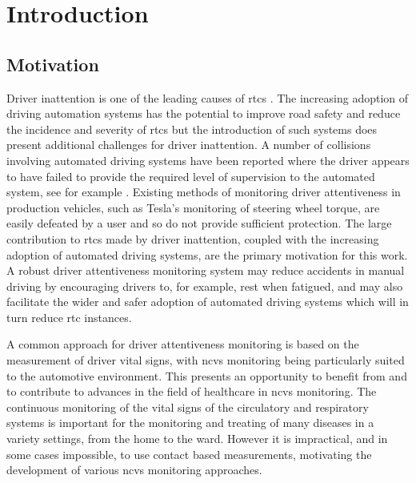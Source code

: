 \documentclass[11pt, parskip=half*,twoside=false]{scrbook}
\begin{document}
\printnoidxglossary[sort=letter, title={List of Abbreviations}]

\mainmatter

\chapter{Introduction} \label{ch:intro}

\section{Motivation} \label{sec:motive}

Driver inattention is one of the leading causes of \glspl{rtc} \citep{petridouHumanFactorsCausation2000,youngDriverDistraction2007,olsonDriverDistractionCommercial2009}. The increasing adoption of driving automation systems has the potential to improve road safety and reduce the incidence and severity of \glspl{rtc} \citep{favaroExaminingAccidentReports2017} but the introduction of such systems does present additional challenges for driver inattention. A number of collisions involving automated driving systems have been reported where the driver appears to have failed to provide the required level of supervision to the automated system, see for example \citep{ntsbCollisionSportUtility2019,ntsbCollisionCarOperating2019}. Existing methods of monitoring driver attentiveness in production vehicles, such as Tesla's monitoring of steering wheel torque, are easily defeated by a user and so do not provide sufficient protection. The large contribution to \glspl{rtc} made by driver inattention, coupled with the increasing adoption of automated driving systems, are the primary motivation for this work. A robust driver attentiveness monitoring system may reduce accidents in manual driving by encouraging drivers to, for example, rest when fatigued, and may also facilitate the wider and safer adoption of automated driving systems which will in turn reduce \gls{rtc} instances. 

A common approach for driver attentiveness monitoring is based on the measurement of driver vital signs, with \gls{ncvs} monitoring being particularly suited to the automotive environment. This presents an opportunity to benefit from and to contribute to advances in the field of healthcare in \gls{ncvs} monitoring. The continuous monitoring of the vital signs of the circulatory and respiratory systems is important for the monitoring and treating of many diseases in a variety settings, from the home to the ward. However it is impractical, and in some cases impossible, to use contact based measurements, motivating the development of various \gls{ncvs} monitoring approaches. 
\end{document}
